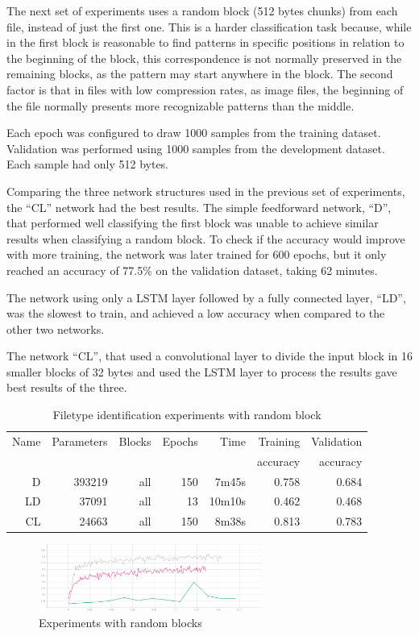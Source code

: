 The next set of experiments uses a random block (512 bytes chunks) from each file, instead of just the first one. This is a harder classification task because, while in the first block is reasonable to find patterns in specific positions in relation to the beginning of the block, this correspondence is not normally preserved in the remaining blocks, as the pattern may start anywhere in the block. The second factor is that in files with low compression rates, as image files, the beginning of the file normally presents more recognizable patterns than the middle.

Each epoch was configured to draw 1000 samples from the training dataset. Validation was performed using 1000 samples from the development dataset. Each sample had only 512 bytes.

Comparing the three network structures used in the previous set of experiments, the ``CL'' network had the best results.
The simple feedforward network, ``D'', that performed well classifying the first block was unable to achieve similar results when classifying a random block.
To check if the accuracy would improve with more training, the network was later trained for 600 epochs, but it only reached an accuracy of 77.5\% on the validation dataset, taking 62 minutes.

The network using only a LSTM layer followed by a fully connected layer, ``LD'', was the slowest to train, and achieved a low accuracy when compared to the other two networks.

The network ``CL'', that used a convolutional layer to divide the input block in 16 smaller blocks of 32 bytes and used the LSTM layer to process the results gave best results of the three.

\begin{table}[!ht]
    \centering
    \caption{Filetype identification experiments with random block}
    \label{tab:carvingrandomblock}
\begin{tabular}{r|r|r|r|r|r|r}
\hline
Name & Parameters & Blocks & Epochs & Time    & Training          & Validation          \\       
     &            &        &        &         &          accuracy &            accuracy \\ \hline\hline

D  & 393219 & all & 150 & 7m45s  & 0.758 & 0.684 \\ \hline
LD & 37091  & all & 13  & 10m10s & 0.462 & 0.468 \\ \hline
CL & 24663  & all & 150 & 8m38s  & 0.813 & 0.783 \\ \hline
\end{tabular}
\end{table}

\begin{figure}[htb!]
\centering\includegraphics[width=0.65\textwidth]{content/random-block.png}
\caption{\label{fig:randomblock}Experiments with random blocks}%
\end{figure}

